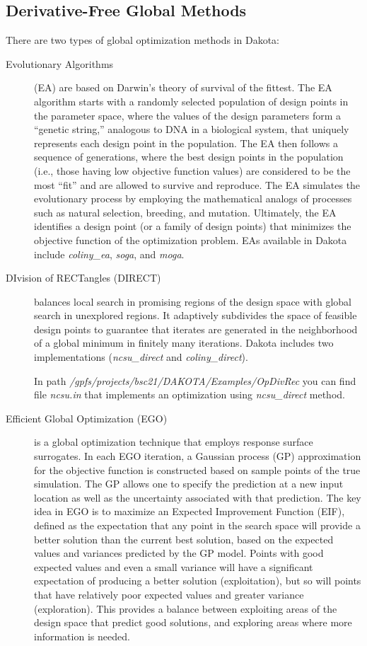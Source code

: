 \documentclass[12pt,a4paper,article]{memoir}
\begin{document}
\subsection{Derivative-Free Global Methods}
There are two types of global optimization methods in Dakota:

\begin{description}
\item[Evolutionary Algorithms] (EA) are based on Darwin’s theory of survival of the fittest. The EA algorithm starts with a randomly selected population of design points in the parameter space, where the values of the design parameters form a “genetic string,” analogous to DNA in a biological system, that uniquely represents each design point in the population. The EA then follows a sequence of generations, where the best design points in the population (i.e., those having low objective function values) are considered to be the most “fit” and are allowed to survive and reproduce. The EA simulates the evolutionary process by employing the mathematical analogs of processes such as natural selection, breeding, and mutation. Ultimately, the EA identifies a design point (or a family of design points) that minimizes the objective function of the optimization problem. EAs available in Dakota include \textit{coliny\_ea}, \textit{soga}, and \textit{moga}.

\item[DIvision of RECTangles (DIRECT)] balances local search in promising regions of the design space with global search in unexplored regions. It adaptively subdivides the space of feasible design points to guarantee that iterates are generated in the neighborhood of a global minimum in finitely many iterations. Dakota includes two implementations (\textit{ncsu\_direct} and \textit{coliny\_direct}).

In path \textit{/gpfs/projects/bsc21/DAKOTA/Examples/OpDivRec} you can find file \textit{ncsu.in} that implements an optimization using \textit{ncsu\_direct} method.

\item[Efficient Global Optimization (EGO)] is a global optimization technique that employs response surface surrogates. In each EGO iteration, a Gaussian process (GP) approximation for the objective function is constructed based on sample points of the true simulation. The GP allows one to specify the prediction at a new input location as well as the uncertainty associated with that prediction. The key idea in EGO is to maximize an Expected Improvement Function (EIF), defined as the expectation that any point in the search space will provide a better solution than the current best solution, based on the expected values and variances predicted by the GP model. Points with good expected values and even a small variance will have a significant expectation of producing a better solution (exploitation), but so will points that have relatively poor expected values and greater variance (exploration). This provides a balance between exploiting areas of the design space that predict good solutions, and exploring areas where more information is needed.


\end{description}
\end{document}
